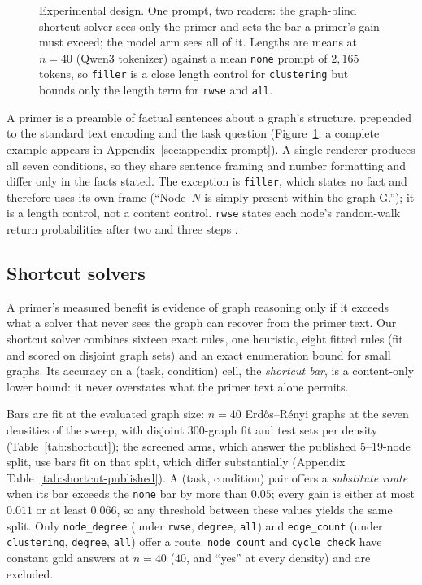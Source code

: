\documentclass[11pt]{article}
\begin{document}
\begin{figure}[t]
\caption{Experimental design. One prompt, two readers: the graph-blind
shortcut solver sees only the primer and sets the bar a primer's gain must
exceed; the model arm sees all of it. Lengths are means at $n{=}40$ (Qwen3
tokenizer) against a mean \texttt{none} prompt of $2{,}165$ tokens, so
\texttt{filler} is a close length control for \texttt{clustering} but
bounds only the length term for \texttt{rwse} and \texttt{all}.}
\label{fig:design}
\end{figure}

A primer is a preamble of factual sentences about a graph's structure,
prepended to the standard text encoding and the task question
(Figure~\ref{fig:design}; a complete example appears in
Appendix~\ref{sec:appendix-prompt}). A single renderer produces all seven
conditions, so they share sentence framing and number formatting and differ
only in the facts stated. The exception is \texttt{filler}, which states no
fact and therefore uses its own frame (``Node~$N$ is simply present within
the graph G.''); it is a length control, not a content control.
\texttt{rwse} states each node's random-walk return probabilities after two
and three steps \citep{dwivedi2022graph}.

\subsection{Shortcut solvers}
\label{sec:shortcuts}

A primer's measured benefit is evidence of graph reasoning only if it
exceeds what a solver that never sees the graph can recover from the
primer text. Our shortcut solver combines sixteen exact rules, one
heuristic, eight fitted rules (fit and scored on disjoint graph sets) and an
exact enumeration bound for small graphs. Its accuracy on a (task,
condition) cell, the \emph{shortcut bar}, is a content-only lower bound: it
never overstates what the primer text alone permits.

Bars are fit at the evaluated graph size: $n{=}40$ Erd\H{o}s--R\'enyi
graphs at the seven densities of the sweep, with disjoint $300$-graph fit
and test sets per density (Table~\ref{tab:shortcut}); the screened arms,
which answer the published $5$--$19$-node split, use bars fit on that split,
which differ substantially (Appendix
Table~\ref{tab:shortcut-published}). A (task, condition) pair offers a
\emph{substitute route} when its bar exceeds the \texttt{none} bar by more
than $0.05$; every gain is either at most $0.011$ or at least $0.066$, so
any threshold between these values yields the same split. Only
\texttt{node\_degree} (under \texttt{rwse}, \texttt{degree}, \texttt{all})
and \texttt{edge\_count} (under \texttt{clustering}, \texttt{degree},
\texttt{all}) offer a route. \texttt{node\_count} and \texttt{cycle\_check}
have constant gold answers at $n{=}40$ ($40$, and ``yes'' at every density)
and are excluded.
\end{document}
